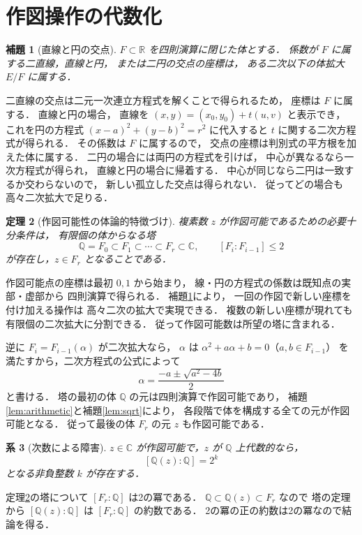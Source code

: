 \documentclass[a5paper,10pt,onecolumn]{jsarticle}
\makeatletter
\theoremstyle{mathnotetheorem}
\newtheorem{theorem}{定理}[section]
\newtheorem{lemma}[theorem]{補題}
\newtheorem{corollary}[theorem]{系}
\renewcommand{\proofname}{証明}
\renewenvironment{proof}[1][\proofname]{%
  \par\pushQED{\qed}\normalfont\topsep4\p@\@plus2\p@\relax
  \trivlist\item[\hskip\labelsep\bfseries #1]\ignorespaces
}{\popQED\endtrivlist\@endpefalse}
\makeatother
\begin{document}
\section{作図操作の代数化}

\begin{lemma}[直線と円の交点]\label{lem:line-circle}
$F\subset\mathbb R$ を四則演算に閉じた体とする．
係数が $F$ に属する二直線，直線と円，
または二円の交点の座標は，
ある二次以下の体拡大 $E/F$ に属する．
\end{lemma}
\begin{proof}
二直線の交点は二元一次連立方程式を解くことで得られるため，
座標は $F$ に属する．
直線と円の場合，
直線を $(x,y)=(x_0,y_0)+t(u,v)$ と表示でき，
これを円の方程式
$(x-a)^2+(y-b)^2=r^2$ に代入すると
$t$ に関する二次方程式が得られる．
その係数は $F$ に属するので，
交点の座標は判別式の平方根を加えた体に属する．
二円の場合には両円の方程式を引けば，
中心が異なるなら一次方程式が得られ，
直線と円の場合に帰着する．
中心が同じなら二円は一致するか交わらないので，
新しい孤立した交点は得られない．
従ってどの場合も高々二次拡大で足りる．
\end{proof}

\begin{theorem}[作図可能性の体論的特徴づけ]\label{thm:constructible}
複素数 $z$ が作図可能であるための必要十分条件は，
有限個の体からなる塔
\[
 \mathbb Q=F_0\subset F_1\subset\cdots\subset F_r
 \subset\mathbb C,\qquad [F_i:F_{i-1}]\le2
\]
が存在し，$z\in F_r$ となることである．
\end{theorem}
\begin{proof}
作図可能点の座標は最初 $0,1$ から始まり，
線・円の方程式の係数は既知点の実部・虚部から
四則演算で得られる．
補題\ref{lem:line-circle}により，
一回の作図で新しい座標を付け加える操作は
高々二次の拡大で実現できる．
複数の新しい座標が現れても有限個の二次拡大に分割できる．
従って作図可能数は所望の塔に含まれる．

逆に $F_{i}=F_{i-1}(\alpha)$ が二次拡大なら，
$\alpha$ は
$\alpha^2+a\alpha+b=0$（$a,b\in F_{i-1}$）
を満たすから，二次方程式の公式によって
\[
 \alpha=\frac{-a\pm\sqrt{a^2-4b}}2
\]
と書ける．
塔の最初の体 $\mathbb Q$ の元は四則演算で作図可能であり，
補題\ref{lem:arithmetic}と補題\ref{lem:sqrt}により，
各段階で体を構成する全ての元が作図可能となる．
従って最後の体 $F_r$ の元 $z$ も作図可能である．
\end{proof}

\begin{corollary}[次数による障害]\label{cor:degree}
$z\in\mathbb C$ が作図可能で，$z$ が $\mathbb Q$ 上代数的なら，
\[
 [\mathbb Q(z):\mathbb Q]=2^k
\]
となる非負整数 $k$ が存在する．
\end{corollary}
\begin{proof}
定理\ref{thm:constructible}の塔について
$[F_r:\mathbb Q]$ は2の冪である．
$\mathbb Q\subset\mathbb Q(z)\subset F_r$ なので
塔の定理から $[\mathbb Q(z):\mathbb Q]$ は
$[F_r:\mathbb Q]$ の約数である．
2の冪の正の約数は2の冪なので結論を得る．
\end{proof}
\end{document}
